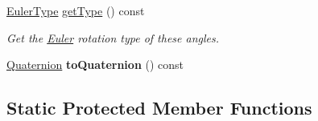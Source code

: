 \begin{Indent}
\begin{DoxyCompactItemize}
\mbox{\hyperlink{classrev_1_1_euler_angles_a27302602f4b1e12892749e201df3d52d}{Euler\+Type}} \mbox{\hyperlink{classrev_1_1_euler_angles_a1603ef7a718dfd42679fd2436d8cd389}{get\+Type}} () const
\begin{DoxyCompactList}\small\item\em Get the \mbox{\hyperlink{class_euler}{Euler}} rotation type of these angles. \end{DoxyCompactList}\item 
\mbox{\label{classrev_1_1_euler_angles_a12c6517153fb0d0f503e4d288c50e84f}} 
\mbox{\hyperlink{classrev_1_1_quaternion}{Quaternion}} {\bfseries to\+Quaternion} () const
\end{DoxyCompactItemize}
\end{Indent}
\subsection*{Static Protected Member Functions}
